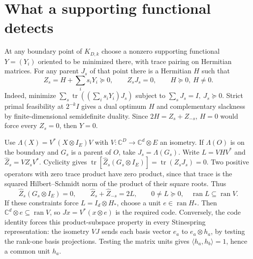 \documentclass[10pt,a4paper]{article}
\newcommand{\tr}{\operatorname{tr}}
\newcommand{\C}{\mathbb C}
\begin{document}
\section{What a supporting functional detects}
At any boundary point of \(K_{D,k}\) choose a nonzero supporting functional \(Y=(Y_i)\) oriented to be minimized there, with trace pairing on Hermitian matrices. For any parent \(J_s\) of that point there is a Hermitian \(H\) such that
\begin{equation}\label{eq:slack}
 Z_s=H+\sum_i s_iY_i\succeq0,\qquad Z_s J_s=0,\qquad H\succeq0,\ H\ne0.
\end{equation}
Indeed, minimize \(\sum_s\tr((\sum_i s_iY_i)J_s)\) subject to \(\sum_sJ_s=I,\ J_s\succeq0\). Strict primal feasibility at \(2^{-k}I\) gives a dual optimum \(H\) and complementary slackness by finite-dimensional semidefinite duality. Since \(2H=Z_s+Z_{-s}\), \(H=0\) would force every \(Z_s=0\), then \(Y=0\).

Use \(\Lambda(X)=V^*(X\otimes I_E)V\) with \(V:\C^D\to\C^d\otimes E\) an isometry. If \(\Lambda(O)\) is on the boundary and \(G_s\) is a parent of \(O\), take \(J_s=\Lambda(G_s)\). Write \(L=VHV^*\) and \(\widehat Z_s=VZ_sV^*\). Cyclicity gives \(\tr[\widehat Z_s(G_s\otimes I_E)]=\tr(Z_sJ_s)=0\). Two positive operators with zero trace product have zero product, since that trace is the squared Hilbert--Schmidt norm of the product of their square roots. Thus
\begin{equation}\label{eq:lift}
 \widehat Z_s(G_s\otimes I_E)=0,\qquad
 \widehat Z_s+\widehat Z_{-s}=2L,\qquad
 0\ne L\succeq0,\quad \operatorname{ran}L\subseteq\operatorname{ran}V .
\end{equation}
If these constraints force \(L=I_d\otimes H_*\), choose a unit \(e\in\operatorname{ran}H_*\). Then \(\C^d\otimes e\subseteq\operatorname{ran}V\), so \(Jx=V^*(x\otimes e)\) is the required code. Conversely, the code identity forces this product-subspace property in every Stinespring representation: the isometry \(VJ\) sends each basis vector \(e_a\) to \(e_a\otimes h_a\), by testing the rank-one basis projections. Testing the matrix units gives \(\langle h_a,h_b\rangle=1\), hence a common unit \(h_a\).
\end{document}
